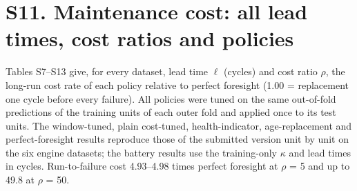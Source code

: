 \documentclass[11pt,a4paper]{article}
\begin{document}
\section*{S11. Maintenance cost: all lead times, cost ratios and policies}

\noindent Tables S7--S13 give, for every dataset, lead time $\ell$ (cycles) and cost ratio $\rho$, the long-run cost rate of each policy relative to perfect foresight (1.00 = replacement one cycle before every failure). All policies were tuned on the same out-of-fold predictions of the training units of each outer fold and applied once to its test units. The window-tuned, plain cost-tuned, health-indicator, age-replacement and perfect-foresight results reproduce those of the submitted version unit by unit on the six engine datasets; the battery results use the training-only $\kappa$ and lead times in cycles. Run-to-failure cost 4.93--4.98 times perfect foresight at $\rho$ = 5 and up to 49.8 at $\rho$ = 50.
\end{document}
